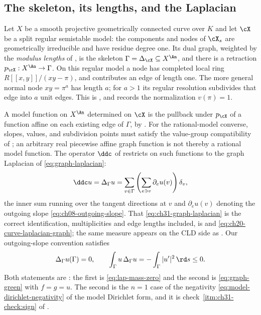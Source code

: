 \subsection{The skeleton, its lengths, and the Laplacian}
\label{sec:ch31-curve-setup}

Let $X$ be a smooth projective geometrically connected curve over
$K$ and let $\cX$ be a split regular semistable model: the components
and nodes of $\cX_s$ are geometrically irreducible and have residue degree
one.  Its dual graph, weighted by the
\emph{modulus lengths} of , is the skeleton
$\Gamma=\Delta_{\cX}\subseteq X^{\An}$, and there is a retraction
$p_{\cX}:X^{\An}\to\Gamma$.  On this regular model a node has completed local ring
$R[[x,y]]/(xy-\pi)$, and contributes an edge of length one.  The more
general normal node $xy=\pi^a$ has length $a$; for $a>1$ its regular
resolution subdivides that edge into $a$ unit edges.  This is
, and records the normalization $v(\pi)=1$.

A model function on $X^{\An}$ determined on $\cX$ is the pullback under
$p_{\cX}$ of a function affine on each existing edge of $\Gamma$, by
.  For the rational-model
converse, slopes, values, and subdivision points must satisfy the
value-group compatibility of \cite[Proposition~3.5]{GJKM19}; an arbitrary
real piecewise affine graph function is not thereby a rational model
function.  The operator $\ddc$ of
 restricts on such functions to the graph Laplacian of
\eqref{eq:graph-laplacian}:
\begin{equation}
              \ddc u=\Delta_\Gamma u
              =\sum_{v\in\Gamma}
                 \left(\sum_{e\ni v}\partial_eu(v)\right)\delta_v ,
\label{eq:ch31-graph-laplacian}
\end{equation}
the inner sum running over the tangent directions at $v$ and
$\partial_e u(v)$ denoting the outgoing slope
\eqref{eq:ch08-outgoing-slope}.  That \eqref{eq:ch31-graph-laplacian} is the
correct identification, multiplicities and edge lengths included, is
 and \eqref{eq:ch20-curve-laplacian-graph};
the same measure appears on the CLD side as
.  Our outgoing-slope convention
satisfies
\begin{equation}
           \Delta_\Gamma u(\Gamma)=0,
           \qquad
           \int_\Gamma u\,\Delta_\Gamma u
                    =-\int_\Gamma|u'|^2\,\rd s\leq0 .
\label{eq:graph-dirichlet-sign}
\end{equation}
Both statements are : the first is
\eqref{eq:lap-mass-zero} and the second is \eqref{eq:graph-green} with
$f=g=u$.  The second is the $n=1$ case of the negativity
\eqref{eq:model-dirichlet-negativity} of the model Dirichlet form, and it is
check~\cref{itm:ch31-check:sign} of .


